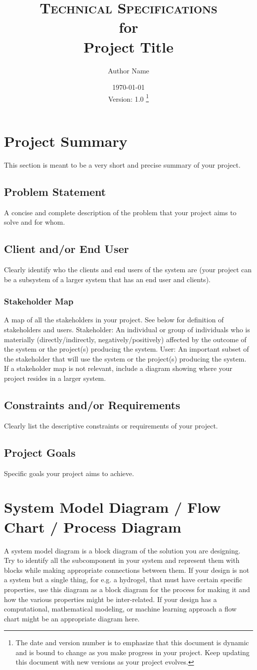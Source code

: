 \documentclass[11pt, oneside]{article}   	%
\title{\textsc{Technical Specifications} \\ 
	\small{for} \\ 
	\Large{Project Title}}  %
\author{Author Name}  %
\date{\today \\ 
	Version: 1.0 \footnote{The date and version number is to emphasize that this document is dynamic and is bound to change as you make progress in your project. Keep updating this document with new versions as your project evolves.}} %
\begin{document}
\maketitle

\section{Project Summary}
This section is meant to be a very short and precise summary of your project. 
\subsection{Problem Statement}
A concise and complete description of the problem that your project aims to solve and for whom.
\subsection{Client and/or End User}
Clearly identify who the clients and end users of the system are (your project can be a subsystem of a larger system that has an end user and clients).
\subsubsection{Stakeholder Map}
A map of all the stakeholders in your project. See below for definition of stakeholders and users.
Stakeholder: An individual or group of individuals who is materially (directly/indirectly, negatively/positively) affected by the outcome of the system or the project(s) producing the system. 
User: An important subset of the stakeholder that will use the system or the project(s) producing the system.
If a stakeholder map is not relevant, include a diagram showing where your project resides in a larger system.
\subsection{Constraints and/or Requirements}
Clearly list the descriptive constraints or requirements of your project.
\subsection{Project Goals}
Specific goals your project aims to achieve.

\section{System Model Diagram / Flow Chart / Process Diagram}
A system model diagram is a block diagram of the solution you are designing. Try to identify all the subcomponent in your system and represent them with blocks while making appropriate connections between them. If your design is not a system but a single thing, for e.g. a hydrogel, that must have certain specific properties, use this diagram as a block diagram for the process for making it and how the various properties might be inter-related. If your design has a computational, mathematical modeling, or machine learning approach a flow chart might be an appropriate diagram here. 
\end{document}
